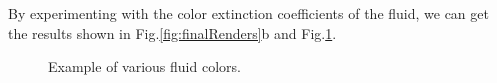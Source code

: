 \noindent
By experimenting with the color extinction coefficients of the fluid, we can get the results shown in Fig.\ref{fig:finalRenders}b and Fig.\ref{fig:colors}.

\begin{figure}[ht!]
    \centering
        \hfill
    \caption{Example of various fluid colors.}\label{fig:colors}
\end{figure}